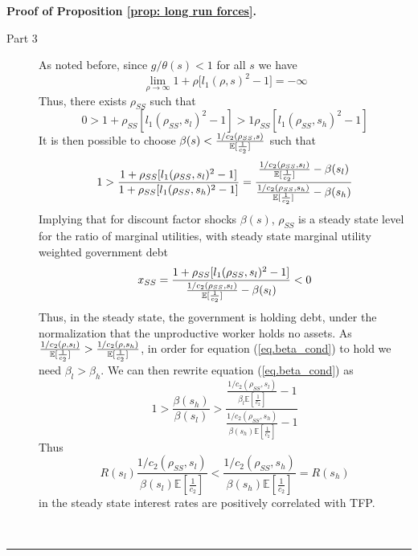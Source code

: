 \documentclass[thmsb,11pt]{article}
\newenvironment{proof}[1][Proof]{\noindent \textbf{#1.} }{\  \rule{0.5em}{0.5em}}
\begin{document}
\begin{proof}[Proof of Proposition \ref{prop: long run forces}]
\begin{description}
\item[Part 3] As noted before, since $g/\theta (s)<1$ for all $s$ we have
\begin{equation*}
\lim_{\rho \rightarrow \infty }1+\rho \lbrack l_{1}(\rho ,s)^{2}-1]=-\infty
\end{equation*}%
Thus, there exists $\rho_{SS}$ such that
\begin{equation*}
0>1+\rho_{SS}[l_{1}(\rho_{SS},s_{l})^{2}-1]>1\rho_{SS}[l_{1}(\rho_{SS},s_{h})^{2}-1]
\end{equation*}%
It is then possible to choose $\beta (s)<\frac{1/c_{2}(\rho_{SS},s)}{%
\mathbb{E}[\frac{1}{c_{2}}]}$ such that
\begin{equation}
1>\frac{1+\rho_{SS}[l_{1}(\rho_{SS},s_{l})^{2}-1]}{1+\rho_{SS}[l_{1}(\rho_{SS},s_{h})^{2}-1]}=\frac{\frac{1/c_{2}(\rho_{SS},s_{l})%
}{\mathbb{E}[\frac{1}{c_{2}}]}-\beta (s_{l})}{\frac{%
1/c_{2}(\rho_{SS},s_{h})}{\mathbb{E}[\frac{1}{c_{2}}]}%
-\beta (s_{h})}  \label{eq.beta_cond}
\end{equation}%
Implying that for discount factor shocks $\beta (s)$, $\rho_{SS}$ is a
steady state level for the ratio of marginal utilities, with steady state
marginal utility weighted government debt
\begin{equation*}
x_{SS}=\frac{1+\rho_{SS}[l_{1}(\rho_{SS},s_{l})^{2}-1]}{\frac{%
1/c_{2}(\rho_{SS},s_{l})}{\mathbb{E}[\frac{1}{c_{2}}]}%
-\beta (s_{l})}<0
\end{equation*}%
Thus, in the steady state, the government is holding debt, under the
normalization that the unproductive worker holds no assets. As $\frac{%
1/c_{2}(\rho ,s_{l})}{\mathbb{E}[\frac{1}{c_{2}}]}>\frac{1/c_{2}(\rho
,s_{h})}{\mathbb{E}[\frac{1}{c_{2}}]}$, in order for equation (\ref{eq.beta_cond}) to hold we need $\beta _{l}>\beta _{h}$. We can then rewrite
equation (\ref{eq.beta_cond}) as
\begin{equation*}
1>\frac{\beta (s_{h})}{\beta (s_{l})}>\frac{\frac{1/c_{2}(\rho_{SS},s_{l})}{\beta
_{l}\mathbb{E}[\frac{1}{c_{2}}]}-1}{\frac{1/c_{2}(\rho_{SS} ,s_{h})}{\beta
(s_{h})\mathbb{E}[\frac{1}{c_{2}}]}-1}
\end{equation*}%
Thus
\begin{equation}
R(s_{l})\frac{1/c_{2}(\rho_{SS} ,s_{l})}{\beta (s_{l})\mathbb{E}[\frac{1}{c_{2}}%
]}<\frac{1/c_{2}(\rho_{SS} ,s_{h})}{\beta (s_{h})\mathbb{E}[\frac{1}{c_{2}}%
]}=R(s_{h})
\end{equation}%
in the steady state interest rates are positively correlated with TFP.
\end{description}
\end{proof}
\end{document}

